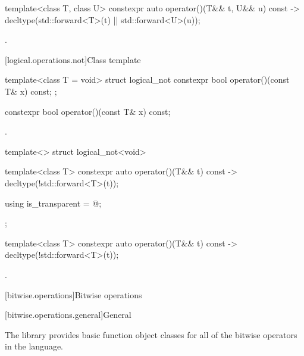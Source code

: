 %
\begin{itemdecl}
template<class T, class U> constexpr auto operator()(T&& t, U&& u) const
  -> decltype(std::forward<T>(t) || std::forward<U>(u));
\end{itemdecl}

\begin{itemdescr}
\pnum
\returns
{}.
\end{itemdescr}

[logical.operations.not]{Class template }

%
\begin{itemdecl}
template<class T = void> struct logical_not {
  constexpr bool operator()(const T& x) const;
};
\end{itemdecl}

%
\begin{itemdecl}
constexpr bool operator()(const T& x) const;
\end{itemdecl}

\begin{itemdescr}
\pnum
\returns
{}.
\end{itemdescr}

%
\begin{itemdecl}
template<> struct logical_not<void> {
  template<class T> constexpr auto operator()(T&& t) const
    -> decltype(!std::forward<T>(t));

  using is_transparent = @\unspec@;
};
\end{itemdecl}

%
\begin{itemdecl}
template<class T> constexpr auto operator()(T&& t) const
  -> decltype(!std::forward<T>(t));
\end{itemdecl}

\begin{itemdescr}
\pnum
\returns
{}.
\end{itemdescr}


[bitwise.operations]{Bitwise operations}

[bitwise.operations.general]{General}

\pnum
The library provides basic function object classes for all of the bitwise
operators in the language.

